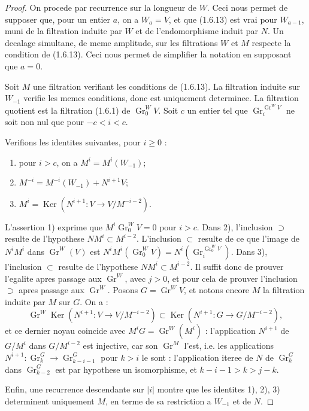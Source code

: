 \documentclass[12pt,a4paper]{article}
\theoremstyle{plain}
\theoremstyle{definition}
\theoremstyle{definition}
\theoremstyle{remark}
\DeclareMathOperator{\Gr}{Gr}
\DeclareMathOperator{\Ker}{Ker}
\begin{document}
\begin{proof}
On procede par recurrence sur la longueur de $W$. Ceci nous permet de supposer que, pour un entier $a$, on a $W_a = V$, et que (1.6.13) est vrai pour $W_{a-1}$, muni de la filtration induite par $W$ et de l'endomorphisme induit par $N$. Un decalage simultane, de meme amplitude, sur les filtrations $W$ et $M$ respecte la condition de (1.6.13). Ceci nous permet de simplifier la notation en supposant que $a = 0$.

Soit $M$ une filtration verifiant les conditions de (1.6.13). La filtration induite sur $W_{-1}$ verifie les memes conditions, donc est uniquement determinee. La filtration quotient est la filtration (1.6.1) de $\Gr_0^W V$. Soit $c$ un entier tel que $\Gr_i^{\Gr^W V}$ ne soit non nul que pour $-c < i < c$.

Verifions les identites suivantes, pour $i \geq 0$ :
\begin{enumerate}[nosep]
\item[1)] pour $i > c$, on a $M^i = M^i(W_{-1})$;
\item[2)] $M^{-i} = M^{-i}(W_{-1}) + N^{i+1}V$;
\item[3)] $M^i = \Ker(N^{i+1}: V \to V/M^{-i-2})$.
\end{enumerate}
L'assertion 1) exprime que $M^i \Gr_0^W V = 0$ pour $i > c$. Dans 2), l'inclusion $\supset$ resulte de l'hypothese $NM^i \subset M^{i-2}$. L'inclusion $\subset$ resulte de ce que l'image de $N^i M^i$ dans $\Gr^W(V)$ est $N^i M^i(\Gr_0^W V) = N^i(\Gr_i^{\Gr_0^W V})$. Dans 3), l'inclusion $\subset$ resulte de l'hypothese $NM^i \subset M^{i-2}$. Il suffit donc de prouver l'egalite apres passage aux $\Gr^W$, avec $j > 0$, et pour cela de prouver l'inclusion $\supset$ apres passage aux $\Gr^W$. Posons $G = \Gr^W V$, et notons encore $M$ la filtration induite par $M$ sur $G$. On a :
\[\Gr^W \Ker(N^{i+1}: V \to V/M^{-i-2}) \subset \Ker(N^{i+1}: G \to G/M^{-i-2}),\]
et ce dernier noyau coincide avec $M^i G = \Gr^W(M^i)$ : l'application $N^{i+1}$ de $G/M^i$ dans $G/M^{i-2}$ est injective, car son $\Gr^M$ l'est, i.e. les applications $N^{i+1}: \Gr_k^G \to \Gr_{k-i-1}^G$ pour $k > i$ le sont : l'application iteree de $N$ de $\Gr_k^G$ dans $\Gr_{k-2}^G$ est par hypothese un isomorphisme, et $k - i - 1 > k > j - k$.

Enfin, une recurrence descendante sur $|i|$ montre que les identites 1), 2), 3) determinent uniquement $M$, en terme de sa restriction a $W_{-1}$ et de $N$.
\end{proof}
\end{document}
